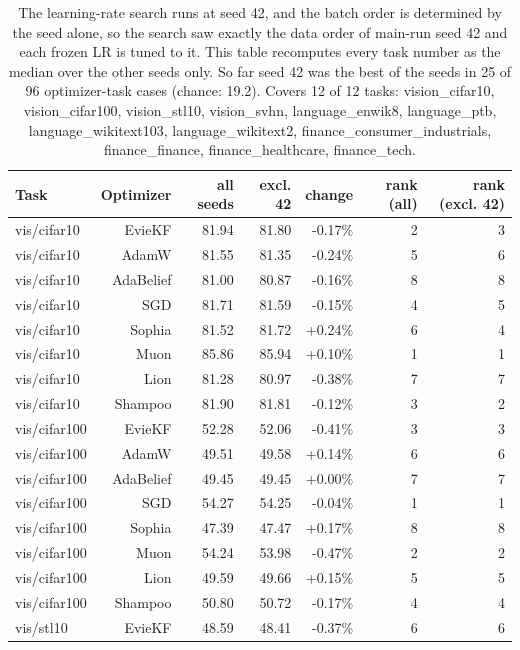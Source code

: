 \begin{table}[t]
\centering
\small
\caption{The learning-rate search runs at seed 42, and the batch order is determined by the seed alone, so the search saw exactly the data order of main-run seed 42 and each frozen LR is tuned to it. This table recomputes every task number as the median over the other seeds only. So far seed 42 was the best of the seeds in 25 of 96 optimizer-task cases (chance: 19.2). Covers 12 of 12 tasks: vision\_cifar10, vision\_cifar100, vision\_stl10, vision\_svhn, language\_enwik8, language\_ptb, language\_wikitext103, language\_wikitext2, finance\_consumer\_industrials, finance\_finance, finance\_healthcare, finance\_tech.}
\label{tab:table3b_excluding_search_seed}
\begin{tabular}{lrrrrrr}
\toprule
Task & Optimizer & all seeds & excl. 42 & change & rank (all) & rank (excl. 42) \\
\midrule
vis/cifar10 & EvieKF & 81.94 & 81.80 & -0.17\% & 2 & 3 \\
vis/cifar10 & AdamW & 81.55 & 81.35 & -0.24\% & 5 & 6 \\
vis/cifar10 & AdaBelief & 81.00 & 80.87 & -0.16\% & 8 & 8 \\
vis/cifar10 & SGD & 81.71 & 81.59 & -0.15\% & 4 & 5 \\
vis/cifar10 & Sophia & 81.52 & 81.72 & +0.24\% & 6 & 4 \\
vis/cifar10 & Muon & 85.86 & 85.94 & +0.10\% & 1 & 1 \\
vis/cifar10 & Lion & 81.28 & 80.97 & -0.38\% & 7 & 7 \\
vis/cifar10 & Shampoo & 81.90 & 81.81 & -0.12\% & 3 & 2 \\
vis/cifar100 & EvieKF & 52.28 & 52.06 & -0.41\% & 3 & 3 \\
vis/cifar100 & AdamW & 49.51 & 49.58 & +0.14\% & 6 & 6 \\
vis/cifar100 & AdaBelief & 49.45 & 49.45 & +0.00\% & 7 & 7 \\
vis/cifar100 & SGD & 54.27 & 54.25 & -0.04\% & 1 & 1 \\
vis/cifar100 & Sophia & 47.39 & 47.47 & +0.17\% & 8 & 8 \\
vis/cifar100 & Muon & 54.24 & 53.98 & -0.47\% & 2 & 2 \\
vis/cifar100 & Lion & 49.59 & 49.66 & +0.15\% & 5 & 5 \\
vis/cifar100 & Shampoo & 50.80 & 50.72 & -0.17\% & 4 & 4 \\
vis/stl10 & EvieKF & 48.59 & 48.41 & -0.37\% & 6 & 6 \\

\end{tabular}
\end{table}
